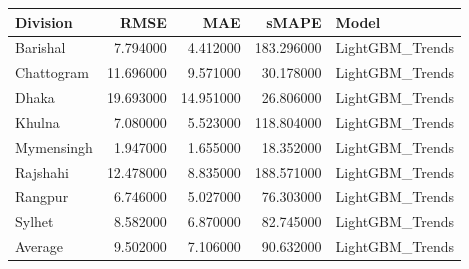 \begin{tabular}{lrrrl}
\toprule
Division & RMSE & MAE & sMAPE & Model \\
\midrule
Barishal & 7.794000 & 4.412000 & 183.296000 & LightGBM_Trends \\
Chattogram & 11.696000 & 9.571000 & 30.178000 & LightGBM_Trends \\
Dhaka & 19.693000 & 14.951000 & 26.806000 & LightGBM_Trends \\
Khulna & 7.080000 & 5.523000 & 118.804000 & LightGBM_Trends \\
Mymensingh & 1.947000 & 1.655000 & 18.352000 & LightGBM_Trends \\
Rajshahi & 12.478000 & 8.835000 & 188.571000 & LightGBM_Trends \\
Rangpur & 6.746000 & 5.027000 & 76.303000 & LightGBM_Trends \\
Sylhet & 8.582000 & 6.870000 & 82.745000 & LightGBM_Trends \\
Average & 9.502000 & 7.106000 & 90.632000 & LightGBM_Trends \\
\bottomrule
\end{tabular}
